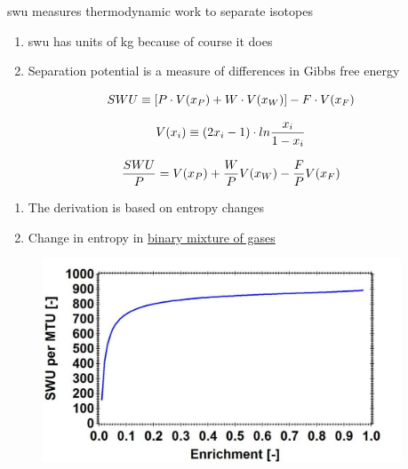 \documentclass[aspectratio=1610,pdftex,dvipsnames,compress,xcolor={dvipsnames}]{beamer}
\newcommand{\acs}{\acrshort} %
\begin{document}
\begin{frame}{\acs{swu} measures thermodynamic work to separate isotopes}
    \begin{enumerate}[series=outerlist,topsep=0pt,itemsep=11pt,leftmargin=*,label=(\arabic*)]
        \item[]\acs{swu} has units of kg because of course it does
        \item[]Separation potential is a measure of differences in Gibbs free energy
    \end{enumerate}

    \vspace*{\fill}

    \begin{equation}
        \LARGE
        SWU \equiv [P \cdot V(x_P)+W \cdot V(x_W)]-F \cdot V(x_F)
    \end{equation}

    \begin{equation}
        \LARGE 
        V(x_i) \equiv (2x_i - 1) \cdot ln \frac{x_i}{1-x_i}
    \end{equation}
    
    \begin{equation}
        \LARGE 
        \frac{SWU}{P} = V(x_P) + \frac{W}{P}V(x_W) - \frac{F}{P}V(x_F)
    \end{equation}
    
    \vspace*{\fill}

    \begin{enumerate}[series=outerlist,topsep=0pt,itemsep=11pt,leftmargin=*,label=(\arabic*)]
        \item[]The derivation is based on entropy changes
        \item[]Change in entropy in \href{https://drive.google.com/file/d/0B1ENwqH9aCq5UnZ4NHNCdHZfN1U/view?resourcekey=0-WXKzU2rJK0q2qVPJcDhutQ}{binary mixture of gases}
    \end{enumerate}
\end{frame}


\begin{frame}{}
    \begin{figure}
        \centering
        \includegraphics[width=0.95\textwidth]{swu.jpg}
    \end{figure}
\end{frame}
\end{document}
